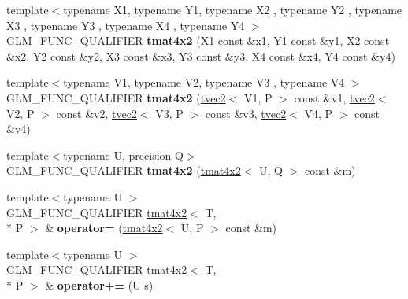 \begin{DoxyCompactItemize}
\item 
\hypertarget{structglm_1_1detail_1_1tmat4x2_a0c0478eabc7a5766b287d58338d16ea2}{{\footnotesize template$<$typename X1, typename Y1, typename X2 , typename Y2 , typename X3 , typename Y3 , typename X4 , typename Y4 $>$ }\\G\-L\-M\-\_\-\-F\-U\-N\-C\-\_\-\-Q\-U\-A\-L\-I\-F\-I\-E\-R {\bfseries tmat4x2} (X1 const \&x1, Y1 const \&y1, X2 const \&x2, Y2 const \&y2, X3 const \&x3, Y3 const \&y3, X4 const \&x4, Y4 const \&y4)}\label{structglm_1_1detail_1_1tmat4x2_a0c0478eabc7a5766b287d58338d16ea2}

\item 
\hypertarget{structglm_1_1detail_1_1tmat4x2_a0d9b0f653d1eb4999d09d71bc0e455f7}{{\footnotesize template$<$typename V1, typename V2, typename V3 , typename V4 $>$ }\\G\-L\-M\-\_\-\-F\-U\-N\-C\-\_\-\-Q\-U\-A\-L\-I\-F\-I\-E\-R {\bfseries tmat4x2} (\hyperlink{structglm_1_1detail_1_1tvec2}{tvec2}$<$ V1, P $>$ const \&v1, \hyperlink{structglm_1_1detail_1_1tvec2}{tvec2}$<$ V2, P $>$ const \&v2, \hyperlink{structglm_1_1detail_1_1tvec2}{tvec2}$<$ V3, P $>$ const \&v3, \hyperlink{structglm_1_1detail_1_1tvec2}{tvec2}$<$ V4, P $>$ const \&v4)}\label{structglm_1_1detail_1_1tmat4x2_a0d9b0f653d1eb4999d09d71bc0e455f7}

\item 
\hypertarget{structglm_1_1detail_1_1tmat4x2_a81ca48dabefc74d85c49880c33f0f6e5}{{\footnotesize template$<$typename U, precision Q$>$ }\\G\-L\-M\-\_\-\-F\-U\-N\-C\-\_\-\-Q\-U\-A\-L\-I\-F\-I\-E\-R {\bfseries tmat4x2} (\hyperlink{structglm_1_1detail_1_1tmat4x2}{tmat4x2}$<$ U, Q $>$ const \&m)}\label{structglm_1_1detail_1_1tmat4x2_a81ca48dabefc74d85c49880c33f0f6e5}

\item 
\hypertarget{structglm_1_1detail_1_1tmat4x2_a2944e0d88d5337848dc71a591f6769e4}{{\footnotesize template$<$typename U $>$ }\\G\-L\-M\-\_\-\-F\-U\-N\-C\-\_\-\-Q\-U\-A\-L\-I\-F\-I\-E\-R \hyperlink{structglm_1_1detail_1_1tmat4x2}{tmat4x2}$<$ T, \\*
P $>$ \& {\bfseries operator=} (\hyperlink{structglm_1_1detail_1_1tmat4x2}{tmat4x2}$<$ U, P $>$ const \&m)}\label{structglm_1_1detail_1_1tmat4x2_a2944e0d88d5337848dc71a591f6769e4}

\item 
\hypertarget{structglm_1_1detail_1_1tmat4x2_a9512b9a0aa009befd7905ab1ecbb966c}{{\footnotesize template$<$typename U $>$ }\\G\-L\-M\-\_\-\-F\-U\-N\-C\-\_\-\-Q\-U\-A\-L\-I\-F\-I\-E\-R \hyperlink{structglm_1_1detail_1_1tmat4x2}{tmat4x2}$<$ T, \\*
P $>$ \& {\bfseries operator+=} (U s)}\label{structglm_1_1detail_1_1tmat4x2_a9512b9a0aa009befd7905ab1ecbb966c}


\end{DoxyCompactItemize}
